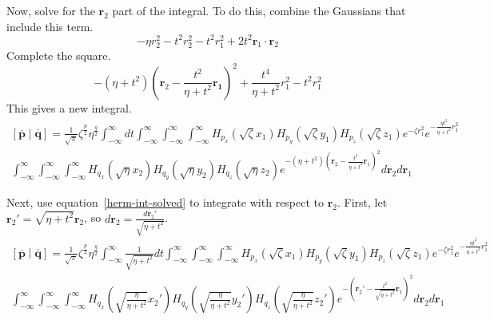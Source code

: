 \documentclass[twoside,10pt,draft]{article}
\begin{document}
Now, solve for the $\mathbf{r}_2$ part of the integral. To do this, combine the Gaussians that include this term.
\begin{equation}
  -\eta r_2^2 - t^2 r_2^2 - t^2 r_1^2 + 2t^2 \mathbf{r}_1 \cdot \mathbf{r}_2
\end{equation}
Complete the square.
\begin{equation}
  -\left(\eta + t^2\right)\left(\mathbf{r}_2 - \frac{t^2}{\eta + t^2}\mathbf{r_1}\right)^2 + \frac{t^4}{\eta + t^2}r_1^2 - t^2r_1^2
\end{equation}
This gives a new integral.
\begin{multline}
  \left[\overline{\mathbf{p}}\middle|\overline{\mathbf{q}}\right] = \frac{1}{\sqrt{\pi}} \zeta^{\frac{p}{2}} \eta^{\frac{q}{2}} \int_{-\infty}^\infty dt \int_{-\infty}^\infty \int_{-\infty}^\infty \int_{-\infty}^\infty H_{p_x}\left(\sqrt{\zeta} x_1\right) H_{p_y}\left(\sqrt{\zeta} y_1\right) H_{p_z}\left(\sqrt{\zeta} z_1\right) e^{-\zeta r_1^2}e^{-\frac{\eta t^2}{\eta + t^2}r_1^2} \\
  \int_{-\infty}^\infty \int_{-\infty}^\infty \int_{-\infty}^\infty H_{q_x}\left(\sqrt{\eta}x_2\right)H_{q_y}\left(\sqrt{\eta}y_2\right)H_{q_z}\left(\sqrt{\eta}z_2\right) e^{-\left(\eta + t^2\right)\left(\mathbf{r}_2 - \frac{t^2}{\eta + t^2}\mathbf{r}_1\right)^2} d\mathbf{r}_2 d\mathbf{r}_1
\end{multline}

Next, use equation~\ref{herm-int-solved} to integrate with respect to $\mathbf{r}_2$. First, let $\mathbf{r}_2' = \sqrt{\eta + t^2}\mathbf{r}_2$, so $d\mathbf{r}_2 = \frac{d\mathbf{r}_2'}{\sqrt{\eta + t^2}}$.
\begin{multline}
  \left[\overline{\mathbf{p}}\middle|\overline{\mathbf{q}}\right] = \frac{1}{\sqrt{\pi}} \zeta^{\frac{p}{2}} \eta^{\frac{q}{2}} \int_{-\infty}^\infty \frac{1}{\sqrt{\eta + t^2}} dt \int_{-\infty}^\infty \int_{-\infty}^\infty \int_{-\infty}^\infty H_{p_x}\left(\sqrt{\zeta} x_1\right) H_{p_y}\left(\sqrt{\zeta} y_1\right) H_{p_z}\left(\sqrt{\zeta} z_1\right) e^{-\zeta r_1^2}e^{-\frac{\eta t^2}{\eta + t^2}r_1^2} \\
  \int_{-\infty}^\infty \int_{-\infty}^\infty \int_{-\infty}^\infty H_{q_x}\left(\sqrt{\frac{\eta}{\eta + t^2}}x_2'\right)H_{q_y}\left(\sqrt{\frac{\eta}{\eta + t^2}}y_2'\right)H_{q_z}\left(\sqrt{\frac{\eta}{\eta + t^2}}z_2'\right) e^{-\left(\mathbf{r}_2' - \frac{t^2}{\sqrt{\eta + t^2}}\mathbf{r}_1\right)^2} d\mathbf{r}_2 d\mathbf{r}_1
\end{multline}
\end{document}
